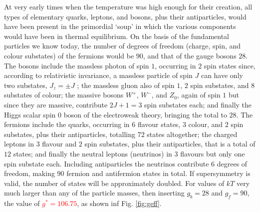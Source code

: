 \documentclass[12pt,a4paper]{article}
\begin{document}
At very early times when the temperature was high enough for their creation, all types of elementary quarks, leptons, and bosons, plus their antiparticles, would have been present in the primordial `soup' in which the various components would have been in thermal equilibrium. On the basis of the fundamental particles we know today, the number of degrees of freedom (charge, spin, and colour substates) of the fermions would be $90$, and that of the gauge bosons $28$. The bosons include the massless photon of spin $1$, occurring in $2$ spin states since, according to relativistic invariance, a massless particle of spin $J$ can have only two substates, $J_z = \pm J$ ; the massless gluon also of spin $1$, $2$ spin substates, and $8$ substates of colour; the massive bosons $W^+$, $W^-$, and $Z_0$, again of spin $1$ but since they are massive, contribute $2J +1 = 3$ spin substates each; and finally the Higgs scalar spin $0$ boson of the electroweak theory, bringing the total to $28$. The fermions include the quarks, occurring in $6$ flavour states, $3$ colour, and $2$ spin substates, plus their antiparticles, totalling $72$ states altogether; the charged leptons in $3$ flavour and $2$ spin substates, plus their antiparticles, that is a total of $12$ states; and finally the neutral leptons (neutrinos) in $3$ flavours but only one spin substate each. Including antiparticles the neutrinos contribute $6$ degrees of freedom, making $90$ fermion and antifermion states in total. If
supersymmetry is valid, the number of states will be approximately doubled. For values of $kT$ very much larger than any of the particle masses, then inserting $g_b = 28$ and $g_f = 90$, the value of \textcolor{red}{$g^\ast = 106.75$}, as shown inf Fig. \ref{fig:geff}. 
\end{document}
